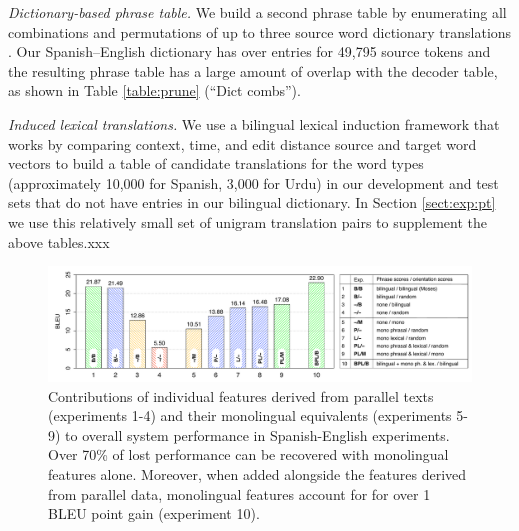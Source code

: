 \documentclass[11pt]{article}
\newcommand{\todo}[1]{\textcolor{red}{TODO: #1}}
\newcommand{\paraheader}[1]{\vskip 0.05in \noindent\emph{#1}}
\begin{document}
\paraheader{Dictionary-based phrase table.} We build a second phrase table by enumerating all combinations and permutations of up to three source word dictionary translations \cite{garera08a}. Our Spanish--English dictionary has over entries for 49,795 source tokens and the resulting phrase table has a large amount of overlap with the decoder table, as shown in Table \ref{table:prune} (``Dict combs''). 

\paraheader{Induced lexical translations.} We use a bilingual lexical induction framework that works by comparing context, time, and edit distance source and target word vectors to build a table of candidate translations for the word types (approximately 10,000 for Spanish, 3,000 for Urdu) in our development and test sets that do not have entries in our bilingual dictionary. In Section \ref{sect:exp:pt} we use this relatively small set of unigram translation pairs to supplement the above tables.xxx





\begin{figure}[t]
\begin{center}
\includegraphics[width=\linewidth]{../figures/lesionreplacement/lesionreplacementlegend.pdf}
\caption{Contributions of individual features derived from parallel texts (experiments 1-4) and their monolingual equivalents (experiments 5-9) to overall system performance in Spanish-English experiments.  Over 70\% of lost performance can be recovered with monolingual features alone.  Moreover, when added alongside the features derived from parallel data, monolingual features account for for over 1 BLEU point gain (experiment 10).}
\label{fig:lesionreplacement}
\end{center}
\vskip -0.2in
\end{figure}
\end{document}
